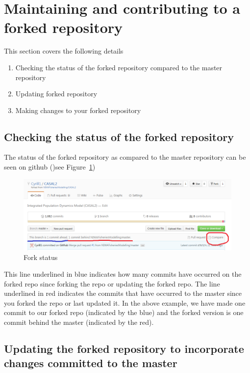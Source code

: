 \section{Maintaining and contributing to a forked repository\label{sec:maintain_repo}}

This section covers the following details

\begin{enumerate}
	\item Checking the status of the forked repository compared to the master repository
	\item Updating forked repository
	\item Making changes to your forked repository
\end{enumerate}

\subsection{Checking the status of the forked repository}

The status of the forked repository as compared to the master repository can be seen on github ()see Figure~\ref{fig:fork_status})

\begin{figure}[!ht]
	\includegraphics[scale=0.6]{Figures/fork_status.png}
	\caption{Fork status}\label{fig:fork_status}
\end{figure}

This line underlined in blue indicates how many commits have occurred on the forked repo since forking the repo or updating the forked repo. The line underlined in red indicates the commits that have occurred to the master since you forked the repo or last updated it. In the above example, we have made one commit to our forked repo (indicated by the blue) and the forked version is one commit behind the master (indicated by the red). 



\subsection{Updating the forked repository to incorporate changes committed to the master}


